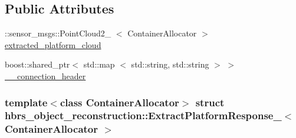 \subsection*{\-Public \-Attributes}
\begin{DoxyCompactItemize}
\item 
\-::sensor\-\_\-msgs\-::\-Point\-Cloud2\-\_\-\*
$<$ \-Container\-Allocator $>$ \hyperlink{structhbrs__object__reconstruction_1_1_extract_platform_response___a4a381bfcb814115a2c0cbeff6f16dbf3}{extracted\-\_\-platform\-\_\-cloud}
\item 
boost\-::shared\-\_\-ptr$<$ std\-::map\*
$<$ std\-::string, std\-::string $>$ $>$ \hyperlink{structhbrs__object__reconstruction_1_1_extract_platform_response___a2f07573bdee38c36a10d7880923dc5f6}{\-\_\-\-\_\-connection\-\_\-header}
\end{DoxyCompactItemize}
\subsubsection*{template$<$class Container\-Allocator$>$ struct hbrs\-\_\-object\-\_\-reconstruction\-::\-Extract\-Platform\-Response\-\_\-$<$ Container\-Allocator $>$}



